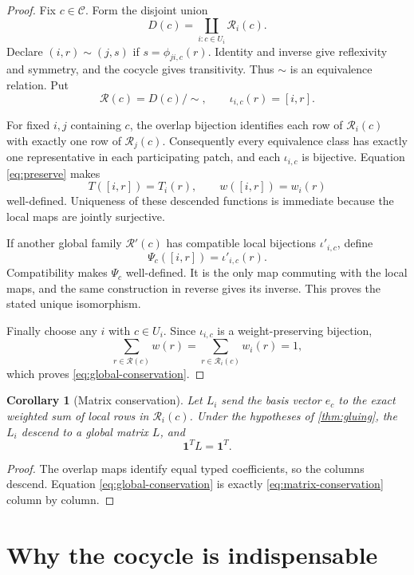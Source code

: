 \documentclass[11pt]{article}
\newtheorem{corollary}[theorem]{Corollary}
\theoremstyle{definition}
\theoremstyle{remark}
\newcommand{\Rows}{\mathcal R}
\newcommand{\Cuts}{\mathcal C}
\begin{document}
\begin{proof}
Fix \(c\in\Cuts\).  Form the disjoint union
\[
 D(c)=\coprod_{i:c\in U_i}\Rows_i(c).
\]
Declare \((i,r)\sim(j,s)\) if \(s=\phi_{ji,c}(r)\).  Identity and
inverse give reflexivity and symmetry, and the cocycle gives
transitivity.  Thus \(\sim\) is an equivalence relation.  Put
\[
 \Rows(c)=D(c)/{\sim},\qquad
 \iota_{i,c}(r)=[i,r].
 \tag{3.2}\label{eq:quotient}
\]

For fixed \(i,j\) containing \(c\), the overlap bijection identifies
each row of \(\Rows_i(c)\) with exactly one row of \(\Rows_j(c)\).
Consequently every equivalence class has exactly one representative
in each participating patch, and each \(\iota_{i,c}\) is bijective.
Equation \eqref{eq:preserve} makes
\[
 T([i,r])=T_i(r),\qquad w([i,r])=w_i(r)
\]
well-defined.  Uniqueness of these descended functions is immediate
because the local maps are jointly surjective.

If another global family \(\Rows'(c)\) has compatible local
bijections \(\iota'_{i,c}\), define
\[
 \Psi_c([i,r])=\iota'_{i,c}(r).
\]
Compatibility makes \(\Psi_c\) well-defined.  It is the only map
commuting with the local maps, and the same construction in reverse
gives its inverse.  This proves the stated unique isomorphism.

Finally choose any \(i\) with \(c\in U_i\).  Since
\(\iota_{i,c}\) is a weight-preserving bijection,
\[
 \sum_{r\in\Rows(c)}w(r)
 =\sum_{r\in\Rows_i(c)}w_i(r)=1,
\]
which proves \eqref{eq:global-conservation}.
\end{proof}

\begin{corollary}[Matrix conservation]\label{cor:matrix}
Let \(L_i\) send the basis vector \(e_c\) to the exact weighted sum of
local rows in \(\Rows_i(c)\).  Under the hypotheses of
\cref{thm:gluing}, the \(L_i\) descend to a global matrix \(L\), and
\[
 \mathbf 1^{T}L=\mathbf 1^{T}.
 \tag{3.3}\label{eq:matrix-conservation}
\]
\end{corollary}

\begin{proof}
The overlap maps identify equal typed coefficients, so the columns
descend.  Equation \eqref{eq:global-conservation} is exactly
\eqref{eq:matrix-conservation} column by column.
\end{proof}

\section{Why the cocycle is indispensable}
\end{document}
